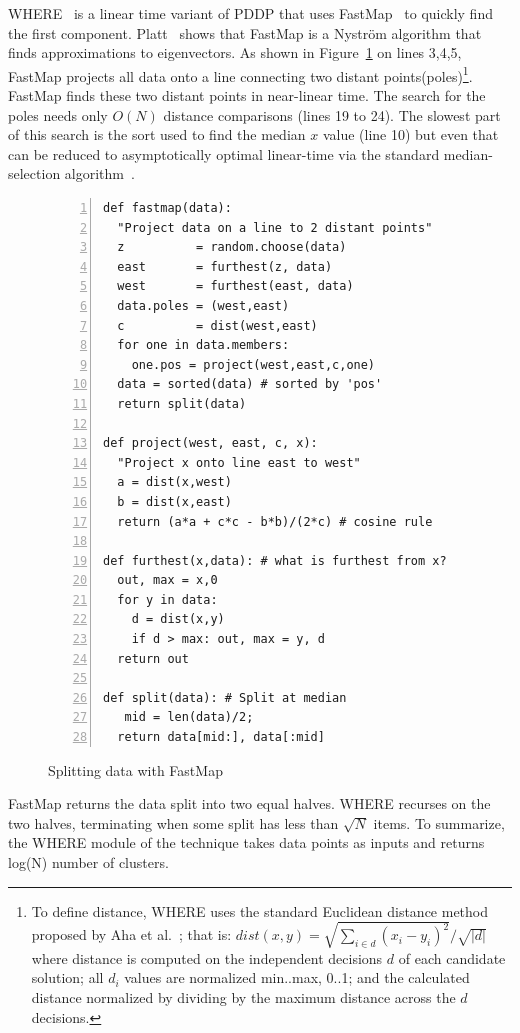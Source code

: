 \documentclass{sig-alternative}
\newcommand{\fig}[1]{Figure~\ref{fig:#1}}
\begin{document}
WHERE~\cite{me12d} is a linear time variant of PDDP  
that uses FastMap~\cite{Faloutsos1995} to quickly find the first component.
Platt~\cite{platt05} shows that FastMap is a  Nystr\"om algorithm that finds approximations to eigenvectors.
As shown in \fig{fastmapCode} on lines 3,4,5, FastMap  projects all data onto a line connecting two distant points(poles)\footnote{
To define distance, WHERE uses the standard Euclidean distance method proposed by Aha et al.~\cite{aha91}; that is: $dist(x,y)= \sqrt{\sum_{i\in d} (x_i - y_i)^2}/\sqrt{ \left\vert{d}\right\vert }$ where distance is computed on the independent decisions $d$ of each candidate solution; all $d_i$ values are normalized min..max, 0..1; and the calculated distance normalized by dividing by the maximum distance across the $d$ decisions.}. 
FastMap finds these two distant points in near-linear time. 
The search for the poles needs only $O(N)$ distance comparisons (lines 19 to 24).
The slowest part of this search is the sort used to find the median $x$ value (line 10) but even that can be reduced to  asymptotically optimal linear-time via the standard median-selection algorithm~\cite{hoare61}.

\begin{figure}[!t] 
\begin{minipage}{3.2in}
\begin{lstlisting}[mathescape,frame=l,numbers=left]
def fastmap(data): 
  "Project data on a line to 2 distant points"
  z          = random.choose(data)
  east       = furthest(z, data)
  west       = furthest(east, data)
  data.poles = (west,east)
  c          = dist(west,east)     
  for one in data.members: 
    one.pos = project(west,east,c,one)
  data = sorted(data) # sorted by 'pos'
  return split(data)

def project(west, east, c, x): 
  "Project x onto line east to west"
  a = dist(x,west)
  b = dist(x,east)
  return (a*a + c*c - b*b)/(2*c) # cosine rule

def furthest(x,data): # what is furthest from x?
  out, max = x,0
  for y in data:
    d = dist(x,y)
    if d > max: out, max = y, d
  return out

def split(data): # Split at median
   mid = len(data)/2; 
  return data[mid:], data[:mid]
\end{lstlisting}
\caption{Splitting data with FastMap}
\label{fig:fastmapCode}  
\end{minipage}
\end{figure}

FastMap returns the data split into two equal halves.
WHERE recurses on the two halves, terminating when some split has less than $\sqrt{N}$ items. To summarize, the WHERE module of the technique takes data points as inputs and returns log(N) number of clusters.
\end{document}

